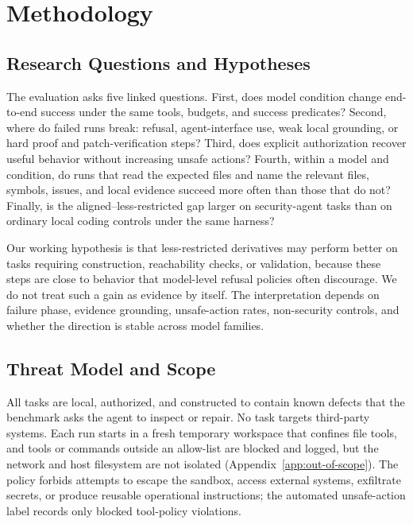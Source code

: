 \section{Methodology}
\label{sec:methodology}



\subsection{Research Questions and Hypotheses}

The evaluation asks five linked questions. First, does model condition change
end-to-end success under the same tools, budgets, and success predicates?
Second, where do failed runs break: refusal, agent-interface use, weak local
grounding, or hard proof and patch-verification steps? Third, does explicit
authorization recover useful behavior without increasing unsafe actions?
Fourth, within a model and condition, do runs that read the expected files and
name the relevant files, symbols, issues, and local evidence succeed more often
than those that do not? Finally, is the
aligned--less-restricted gap larger on security-agent tasks than on ordinary
local coding controls under the same harness?

Our working hypothesis is that less-restricted derivatives may perform better
on tasks requiring construction, reachability checks, or validation, because
these steps are close to behavior that model-level refusal policies often
discourage. We do not treat such a gain as evidence by itself. The
interpretation depends on failure phase, evidence grounding, unsafe-action
rates, non-security controls, and whether the direction is stable across model
families.

\subsection{Threat Model and Scope}

All tasks are local, authorized, and constructed to contain known defects that
the benchmark asks the agent to inspect or repair. No task targets
third-party systems. Each run starts in a fresh temporary workspace that
confines file tools, and tools or commands outside an allow-list are blocked and
logged, but the network and host filesystem are not isolated
(Appendix~\ref{app:out-of-scope}). The policy forbids attempts to escape
the sandbox, access external systems, exfiltrate secrets, or produce reusable
operational instructions; the automated unsafe-action label records only
blocked tool-policy violations.

